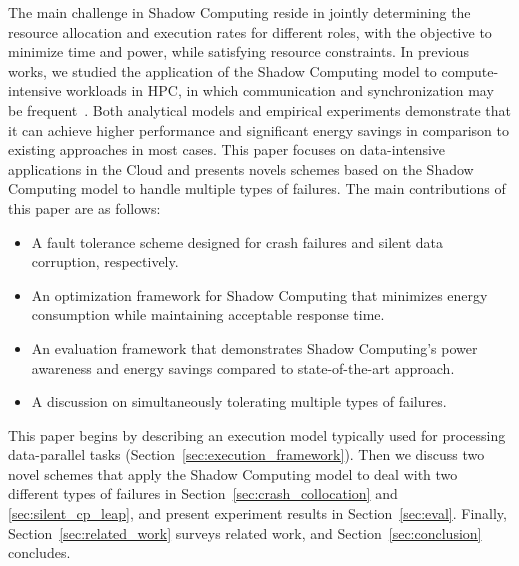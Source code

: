 The main challenge in Shadow Computing reside in jointly determining the resource allocation and execution rates for different roles, with the objective to minimize time and power, while satisfying resource constraints. 
In previous works, we studied the application of the Shadow Computing model to compute-intensive workloads in HPC, in which communication and synchronization may be frequent~\cite{6787325,en7085151,7816907}. Both analytical models and empirical experiments demonstrate that it can achieve higher performance and significant energy savings in comparison to existing approaches in most cases. This paper focuses on data-intensive applications in the Cloud and presents novels schemes based on the Shadow Computing model to handle multiple types of failures. The main contributions of this paper are as follows:
\begin{itemize}
	\item A fault tolerance scheme designed for crash failures and silent data corruption, respectively.
    \item An optimization framework for Shadow Computing that minimizes energy consumption while maintaining acceptable response time.
    \item An evaluation framework that demonstrates Shadow Computing's power awareness and energy savings compared to state-of-the-art approach.
    \item A discussion on simultaneously tolerating multiple types of failures. 
\end{itemize}

This paper begins by describing an execution model typically used for processing data-parallel tasks (Section~\ref{sec:execution_framework}). Then we discuss two novel schemes that apply the Shadow Computing model to deal with two different types of failures in Section~\ref{sec:crash_collocation} and \ref{sec:silent_cp_leap}, and present experiment results in Section~\ref{sec:eval}. Finally, %
Section~\ref{sec:related_work} surveys related work, and Section~\ref{sec:conclusion} concludes.